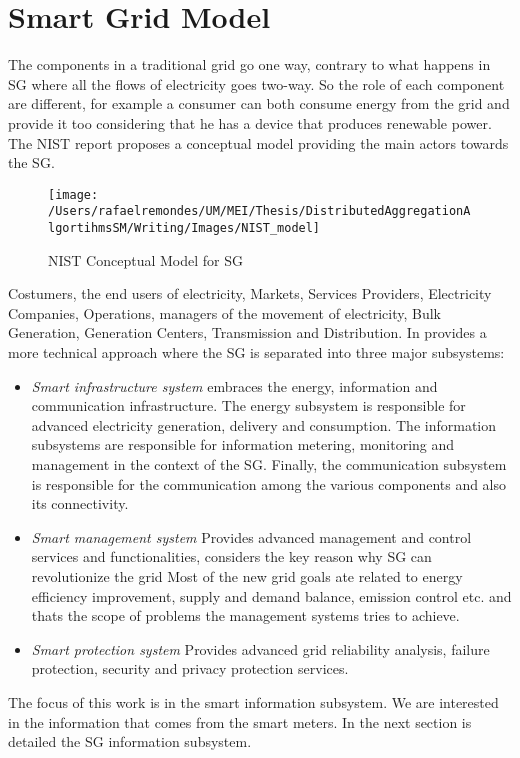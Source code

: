 \section{Smart Grid Model}
 The components in a traditional grid go one way, contrary to what happens in SG where all the flows of electricity goes two-way.  So the role of each component are different, for example a consumer can both consume energy from the grid and provide it too considering that he has a device that produces renewable power. The NIST report \cite{government2011nist} proposes a conceptual model providing the main actors towards the SG.
\begin{figure}[h]
\centering
\texttt{[image: /Users/rafaelremondes/UM/MEI/Thesis/DistributedAggregationAlgortihmsSM/Writing/Images/NIST\_model]}
\caption{\label{fig:NIST_model} NIST Conceptual Model for SG}
\end{figure}
Costumers, the end users of electricity, Markets, Services Providers, Electricity Companies, Operations, managers of the movement of electricity, Bulk Generation, Generation Centers, Transmission and Distribution. 
In \cite{journals/comsur/FangMXY12} provides a more technical approach where the SG is separated into three major subsystems:
\begin{itemize}
\item \textit{Smart infrastructure system} embraces the energy, information and communication infrastructure. The energy subsystem is responsible for advanced electricity generation, delivery and consumption. The information subsystems are responsible for information metering, monitoring and management in the context of the SG. Finally, the communication subsystem is responsible for the communication among the various components and also its connectivity.   
\item \textit{Smart management system} Provides advanced management and control services and functionalities, \cite{journals/comsur/FangMXY12} considers the key reason why SG can revolutionize the grid  
Most of the new grid goals ate related to energy efficiency improvement, supply and demand balance, emission control etc. and thats the scope of problems the management systems tries to achieve.
\item \textit{Smart protection system} Provides advanced grid reliability analysis, failure protection, security and privacy protection services.
 \end{itemize}
The focus of this work is in the smart information subsystem. We are interested in the information that comes from the smart meters. In the next section is detailed the SG information subsystem.
